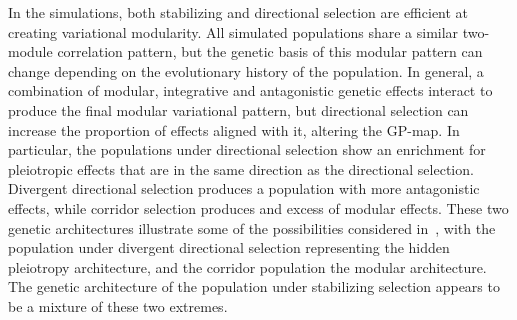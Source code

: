 \begin{refsection}
In the simulations, both stabilizing and directional selection are efficient
at creating variational modularity. All simulated populations share a similar
two-module correlation pattern, but the genetic basis of this modular pattern
can change depending on the evolutionary history of the population. In
general, a combination of modular, integrative and antagonistic genetic
effects interact to produce the final modular variational pattern, but
directional selection can increase the proportion of effects aligned with it,
altering the GP-map. In particular, the populations under directional
selection show an enrichment for pleiotropic effects that are in the same
direction as the directional selection. Divergent directional selection
produces a population with more antagonistic effects, while corridor selection
produces and excess of modular effects. These two genetic architectures
illustrate some of the possibilities considered in~\textcite{Pavlicev2011-xm},
with the population under divergent directional selection representing the
hidden pleiotropy architecture, and the corridor population the modular
architecture. The genetic architecture of the population under stabilizing
selection appears to be a mixture of these two extremes.


\end{refsection}
